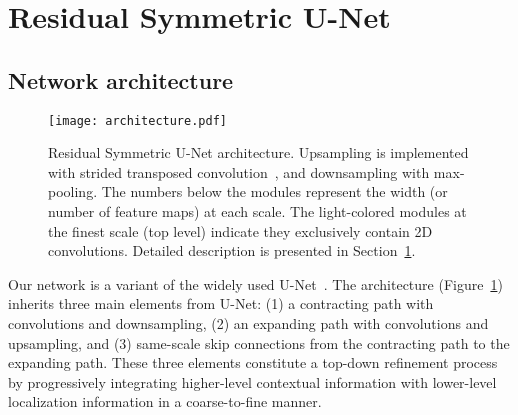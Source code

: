 \documentclass{article}
\begin{document}
\section{Residual Symmetric U-Net}
\label{RSUNet}

\subsection{Network architecture}



\begin{figure}[!t]
\begin{center}
\texttt{[image: architecture.pdf]}
\end{center}

\caption{Residual Symmetric U-Net architecture. Upsampling is implemented with
strided transposed convolution~\cite{dumoulin2016}, and downsampling with
max-pooling. The numbers below the modules represent the width (or number of
feature maps) at each scale. The light-colored modules at the finest scale (top
level) indicate they exclusively contain 2D convolutions. Detailed description
is presented in Section~\ref{RSUNet}.}

\label{fig:architecture}
\end{figure}

Our network is a variant of the widely used U-Net~\cite{ronneberger2015}. The
architecture (Figure~\ref{fig:architecture}) inherits three main elements from
U-Net: (1) a contracting path with convolutions and downsampling, (2) an
expanding path with convolutions and upsampling, and (3) same-scale skip
connections from the contracting path to the expanding path. These three
elements constitute a top-down refinement process~\cite{pinheiro2016,lin2016} by
progressively integrating higher-level contextual information with lower-level
localization information in a coarse-to-fine manner.
\end{document}
